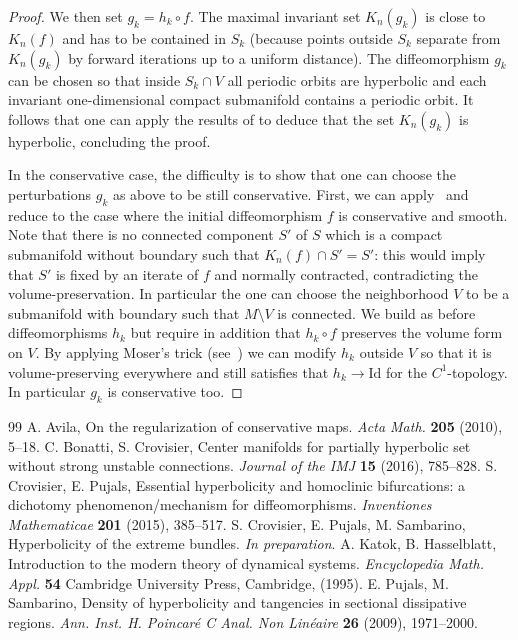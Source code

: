 \documentclass[10pt,a4paper]{amsart}
\numberwithin{equation}{section}     %
\begin{document}
\begin{proof}
We then set $g_k=h_k\circ f$. The maximal invariant set $K_{n}(g_k)$ is close to $K_n(f)$ and has to be contained in $S_k$ (because points outside $S_k$ separate from $K_n(g_k)$ by forward iterations up to a
uniform distance). The diffeomorphism $g_k$ can be chosen so that inside $S_k\cap V$ all periodic orbits are hyperbolic and each invariant one-dimensional compact submanifold contains a periodic orbit. It follows that one can apply the results of \cite{PS-IHP} to deduce that the set $K_n(g_k)$ is hyperbolic, concluding the proof. 

In the conservative case, the difficulty is to show that one can choose the perturbations $g_k$ as above to be still conservative. First, we can apply~\cite{Avila} and reduce to the case where the initial diffeomorphism $f$ is conservative and smooth. Note that there is no connected component $S'$ of $S$ which is a compact submanifold without boundary such that $K_n(f)\cap S'=S'$: this would imply that $S'$ is fixed by an iterate of $f$ and normally contracted, contradicting the volume-preservation. In particular the one can choose the neighborhood $V$ to be a submanifold with boundary such that $M\setminus V$ is connected. We build as before diffeomorphisms $h_k$ but require in addition that $h_k\circ f$ preserves the volume form on $V$. By applying Moser's trick (see~\cite[Theorem 5.1.27]{KH})
we can modify $h_k$ outside $V$ so that it is volume-preserving everywhere and still satisfies that $h_k\to \text{Id}$
for the $C^1$-topology. In particular $g_k$ is conservative too.
\end{proof}


\begin{thebibliography}{99}
 A. Avila, On the regularization of conservative maps. \emph{Acta Math.} \textbf{205} (2010), 5--18.
 C. Bonatti, S. Crovisier, Center manifolds for partially hyperbolic set without strong unstable connections. \emph{Journal of the IMJ} {\bf15} (2016), 785--828.
 S. Crovisier, E. Pujals, Essential hyperbolicity and homoclinic bifurcations: a dichotomy phenomenon/mechanism for diffeomorphisms. \emph{Inventiones Mathematicae} {\bf 201} (2015), 385--517.
 S. Crovisier, E. Pujals, M. Sambarino, Hyperbolicity of the extreme bundles. \emph{In preparation}.
 A. Katok, B. Hasselblatt, Introduction to the modern theory of dynamical systems. \emph{Encyclopedia Math. Appl.} \textbf{54} Cambridge University Press, Cambridge, (1995).
 E. Pujals, M. Sambarino, Density of hyperbolicity and tangencies in sectional dissipative regions. \emph{Ann. Inst. H. Poincar\'e C Anal. Non Lin\'eaire} {\bf 26} (2009), 1971--2000.
\end{thebibliography}
\end{document}
